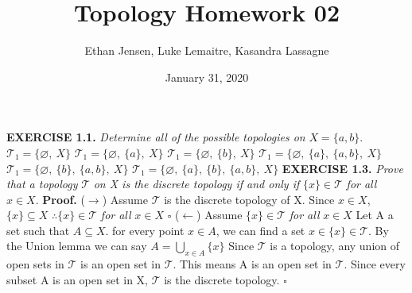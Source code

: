 \documentclass[12pt]{article}
\title{Topology Homework 02}
\author{Ethan Jensen, Luke Lemaitre, Kasandra Lassagne}
\date{January 31, 2020}
\begin{document}
	\maketitle
	\noindent
	\textbf{EXERCISE 1.1.} \textit{Determine all of the possible topologies on} \(X = \{a,b\}\). \newline \newline
	\(\mathcal{T}_1=\{\varnothing,\ X\}\) \newline
	\(\mathcal{T}_1=\{\varnothing,\ \{a\},\ X\}\) \newline
	\(\mathcal{T}_1=\{\varnothing,\ \{b\},\ X\}\) \newline
	\(\mathcal{T}_1=\{\varnothing,\ \{a\},\ \{a,b\},\ X\}\) \newline
	\(\mathcal{T}_1=\{\varnothing,\ \{b\},\ \{a,b\},\ X\}\) \newline
	\(\mathcal{T}_1=\{\varnothing,\ \{a\},\ \{b\},\ \{a,b\},\ X\}\) \newline
	\newpage
	\noindent
	\textbf{EXERCISE 1.3.} \textit{Prove that a topology} \(\mathcal{T}\) \textit{on X is the discrete topology if and only if} \(\{x\}\in\mathcal{T}\) \textit{for all} \(x \in X\). \newline \newline
	\textbf{Proof.} \newline
	(\(\rightarrow\)) Assume \(\mathcal{T}\) is the discrete topology of X. \newline
	Since \(x \in X\), \(\{x\} \subseteq X\) \newline
	\(\therefore \{x\}\in\mathcal{T}\) \textit{for all} \(x \in X\)
	\newline \(\square\) \newline
	(\(\leftarrow\)) Assume \(\{x\}\in\mathcal{T}\) \textit{for all} \(x \in X\) \newline
	Let A a set such that \(A \subseteq X\).
	for every point \(x \in A\), we can find a set \(x \in \{x\}\in\mathcal{T}\). \newline
	By the Union lemma we can say \(A = \bigcup_{x \in A} \{x\}\) \newline
	Since \(\mathcal{T}\) is a topology, any union of open sets in \(\mathcal{T}\) is an open set in \(\mathcal{T}\). \newline \newline
	This means A is an open set in \(\mathcal{T}\). \newline
	Since every subset A is an open set in X, \(\mathcal{T}\) is the discrete topology.
	\newline \(\square\) \newline
\end{document}

